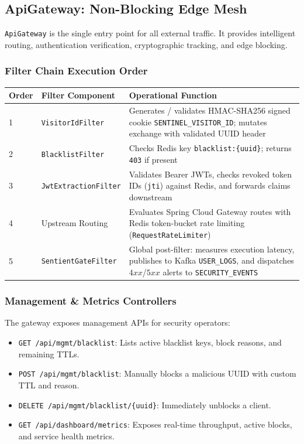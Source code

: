 \documentclass[12pt, a4paper]{article}
\newcommand{\tech}[1]{\texttt{\color{accentblue}#1}}
\newcommand{\service}[1]{\texttt{\color{accentteal}#1}}
\begin{document}
\subsection{ApiGateway: Non-Blocking Edge Mesh}

\service{ApiGateway} is the single entry point for all external traffic. It provides intelligent routing, authentication verification, cryptographic tracking, and edge blocking.

\subsubsection{Filter Chain Execution Order}
\begin{center}
\begin{tabular}{C{1.5cm} L{4.5cm} L{7.5cm}}
\toprule
{}
\textbf{Order} & \textbf{Filter Component} & \textbf{Operational Function} \\
 & \tech{VisitorIdFilter} & Generates / validates HMAC-SHA256 signed cookie \texttt{SENTINEL\_VISITOR\_ID}; mutates exchange with validated UUID header \\
2 & \tech{BlacklistFilter} & Checks Redis key \texttt{blacklist:\{uuid\}}; returns \texttt{403} if present \\
3 & \tech{JwtExtractionFilter} & Validates Bearer JWTs, checks revoked token IDs (\texttt{jti}) against Redis, and forwards claims downstream \\
4 & Upstream Routing & Evaluates Spring Cloud Gateway routes with Redis token-bucket rate limiting (\texttt{RequestRateLimiter}) \\
5 & \tech{SentientGateFilter} & Global post-filter: measures execution latency, publishes to Kafka \texttt{USER\_LOGS}, and dispatches $4xx$/$5xx$ alerts to \texttt{SECURITY\_EVENTS} \\
\bottomrule
\end{tabular}
\end{center}

\subsubsection{Management \& Metrics Controllers}
The gateway exposes management APIs for security operators:
\begin{itemize}[noitemsep]
    \item \texttt{GET /api/mgmt/blacklist}: Lists active blacklist keys, block reasons, and remaining TTLs.
    \item \texttt{POST /api/mgmt/blacklist}: Manually blocks a malicious UUID with custom TTL and reason.
    \item \texttt{DELETE /api/mgmt/blacklist/\{uuid\}}: Immediately unblocks a client.
    \item \texttt{GET /api/dashboard/metrics}: Exposes real-time throughput, active blocks, and service health metrics.
\end{itemize}
\end{document}
